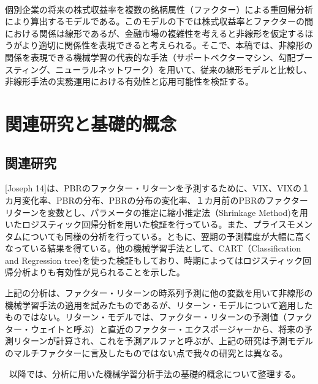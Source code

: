 \ 

個別企業の将来の株式収益率を複数の銘柄属性（ファクター）による重回帰分析により算出するモデルである。このモデルの下では株式収益率とファクターの間における関係は線形であるが、金融市場の複雑性を考えると非線形を仮定するほうがより適切に関係性を表現できると考えられる。そこで、本稿では、非線形の関係を表現できる機械学習の代表的な手法（サポートベクターマシン、勾配ブースティング、ニューラルネットワーク）を用いて、従来の線形モデルと比較し、非線形手法の実務運用における有効性と応用可能性を検証する。



\section{関連研究と基礎的概念} %

\subsection{関連研究}
[Joseph 14]は、PBRのファクター・リターンを予測するために、VIX、VIXの１カ月変化率、PBRの分布、PBRの分布の変化率、１カ月前のPBRのファクターリターンを変数とし、パラメータの推定に縮小推定法（Shrinkage Method)を用いたロジスティック回帰分析を用いた検証を行っている。また、プライスモメンタムについても同様の分析を行っている。ともに、翌期の予測精度が大幅に高くなっている結果を得ている。他の機械学習手法として、CART（Classification and Regression tree)を使った検証もしており、時期によってはロジスティック回帰分析よりも有効性が見られることを示した。

上記の分析は、ファクター・リターンの時系列予測に他の変数を用いて非線形の機械学習手法の適用を試みたものであるが、リターン・モデルについて適用したものではない。リターン・モデルでは、ファクター・リターンの予測値（ファクター・ウェイトと呼ぶ）と直近のファクター・エクスポージャーから、将来の予測リターンが計算され、これを予測アルファと呼ぶが、上記の研究は予測モデルのマルチファクターに言及したものではない点で我々の研究とは異なる。

\ 
以降では、分析に用いた機械学習分析手法の基礎的概念について整理する。

\ 
